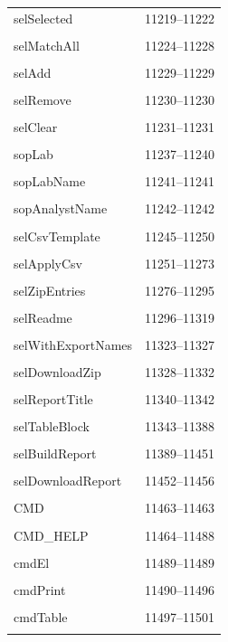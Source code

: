 {\begin{longtable}{@{}p{11cm}r@{}}
selSelected & 11219--11222 \\\\\hline
selMatchAll & 11224--11228 \\\\\hline
selAdd & 11229--11229 \\\\\hline
selRemove & 11230--11230 \\\\\hline
selClear & 11231--11231 \\\\\hline
sopLab & 11237--11240 \\\\\hline
sopLabName & 11241--11241 \\\\\hline
sopAnalystName & 11242--11242 \\\\\hline
selCsvTemplate & 11245--11250 \\\\\hline
selApplyCsv & 11251--11273 \\\\\hline
selZipEntries & 11276--11295 \\\\\hline
selReadme & 11296--11319 \\\\\hline
selWithExportNames & 11323--11327 \\\\\hline
selDownloadZip & 11328--11332 \\\\\hline
selReportTitle & 11340--11342 \\\\\hline
selTableBlock & 11343--11388 \\\\\hline
selBuildReport & 11389--11451 \\\\\hline
selDownloadReport & 11452--11456 \\\\\hline
CMD & 11463--11463 \\\\\hline
CMD\_HELP & 11464--11488 \\\\\hline
cmdEl & 11489--11489 \\\\\hline
cmdPrint & 11490--11496 \\\\\hline
cmdTable & 11497--11501 \\\\\hline

\end{longtable}}
